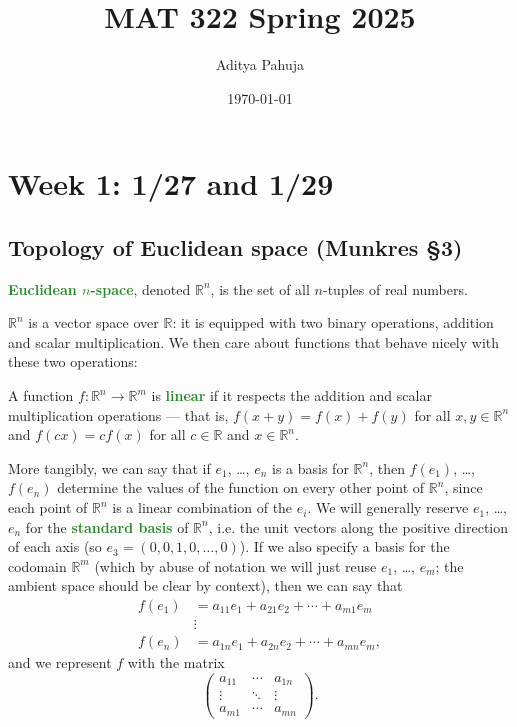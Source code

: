 \documentclass[10pt]{scrartcl}
\title{\vspace{-2.0cm} MAT 322 Spring 2025}
\author{\large Aditya Pahuja}
\date{\large \today}
\providecommand{\RR}{\mathbb R}
\providecommand{\vocab}[1]{{\textbf{\textcolor{ForestGreen}{#1}}}}
\begin{document}
\maketitle
\tableofcontents
\pagebreak

\section{Week 1: 1/27 and 1/29}

\subsection{Topology of Euclidean space (Munkres \S3)}
\begin{definition}
	\vocab{Euclidean $n$-space}, denoted $\RR^n$, is the set
	of all $n$-tuples of real numbers.
\end{definition}

$\RR^n$ is a vector space over $\RR$:
it is equipped with two binary operations,
addition and scalar multiplication.
We then care about functions that behave nicely with
these two operations:

\begin{definition}
	A function $f\colon\RR^n\to\RR^m$ is \vocab{linear}
	if it respects the addition and scalar multiplication operations ---
	that is, $f(x+y) = f(x)+f(y)$ for all $x,y\in\RR^n$
	and $f(cx) = cf(x)$ for all $c\in\RR$ and $x\in\RR^n$.
\end{definition}

More tangibly, we can say that if $e_1$, \dots, $e_n$
is a basis for $\RR^n$, then $f(e_1)$, \dots, $f(e_n)$
determine the values of the function on every other point of $\RR^n$,
since each point of $\RR^n$ is a linear combination of the $e_i$.
We will generally reserve $e_1$, \dots, $e_n$ for the
\vocab{standard basis} of $\RR^n$, i.e. the unit vectors
along the positive direction of each axis (so $e_3 = (0, 0, 1, 0, \dots, 0)$).
If we also specify a basis for the codomain $\RR^m$
(which by abuse of notation we will just reuse $e_1$, \dots, $e_m$;
the ambient space should be clear by context),
then we can say that
\begin{align*}
	f(e_1) &= a_{11}e_1 + a_{21}e_2 + \cdots + a_{m1}e_m\\
	&\vdots\\
	f(e_n) &= a_{1n}e_1 + a_{2n}e_2 + \cdots + a_{mn}e_m,
\end{align*}
and we represent $f$ with the matrix
\[\begin{pmatrix}
	a_{11} &\cdots  &a_{1n}\\
	\vdots & \ddots & \vdots\\
	a_{m1} &\cdots &a_{mn}
\end{pmatrix}.\]
\end{document}
